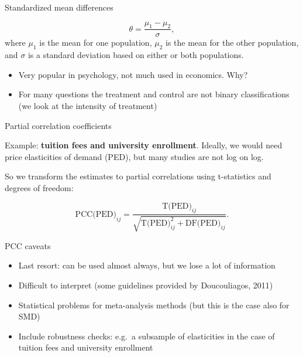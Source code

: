 \documentclass{beamer} %
\begin{document}
\begin{frame}{Standardized mean differences}

\[
\theta = \frac{\mu_1 - \mu_2}{\sigma},
\]
where $\mu_1$ is the mean for one population, $\mu_2$ is the mean for the other population, and $\sigma$ is a standard deviation based on either or both populations.

\bigskip
\begin{itemize}
	\item Very popular in psychology, not much used in economics. Why?
	\item For many questions the treatment and control are not binary classifications (we look at the intensity of treatment)
\end{itemize}


\end{frame}



\begin{frame}{Partial correlation coefficients}

Example: \textbf{tuition fees and university enrollment}. Ideally, we would need price elasticities of demand (PED), but many studies are not log on log.

\smallskip

 So we transform the estimates to partial correlations using t-statistics and degrees of freedom:

\bigskip

\[
\text{PCC(PED)}_{ij} = \frac{\text{T(PED)}_{ij}}{\sqrt{\text{T(PED)}_{ij}^2 + \text{DF(PED)}_{ij}}}.
\]



\end{frame}



\begin{frame}{PCC caveats}
\begin{itemize}
	\item Last resort: can be used almost always, but we lose a lot of information
	\item Difficult to interpret (some guidelines provided by Doucouliagos, 2011)
		\item Statistical problems for meta-analysis methods (but this is the case also for SMD)
	\item Include robustness checks: e.g.\ a subsample of elasticities in the case of tuition fees and university enrollment

\end{itemize}


\end{frame}
\end{document}
